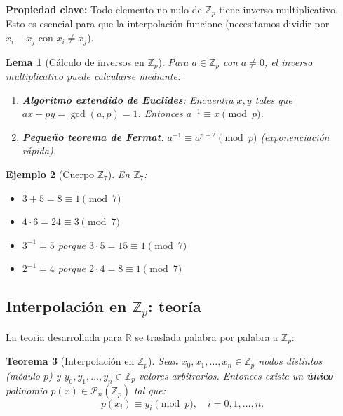\documentclass[a4paper,11pt]{report}
\newtheorem{theorem}{Teorema}[chapter]
\newtheorem{lemma}[theorem]{Lema}
\newtheorem{example}[theorem]{Ejemplo}
\begin{document}
\textbf{Propiedad clave:} Todo elemento no nulo de $\mathbb{Z}_p$ tiene inverso multiplicativo. Esto es esencial para que la interpolación funcione (necesitamos dividir por $x_i - x_j$ con $x_i \neq x_j$).

\begin{lemma}[Cálculo de inversos en $\mathbb{Z}_p$]
Para $a \in \mathbb{Z}_p$ con $a \neq 0$, el inverso multiplicativo puede calcularse mediante:
\begin{enumerate}
\item \textbf{Algoritmo extendido de Euclides}: Encuentra $x, y$ tales que $ax + py = \gcd(a,p) = 1$. Entonces $a^{-1} \equiv x \pmod{p}$.
\item \textbf{Pequeño teorema de Fermat}: $a^{-1} \equiv a^{p-2} \pmod{p}$ (exponenciación rápida).
\end{enumerate}
\end{lemma}

\begin{example}[Cuerpo $\mathbb{Z}_7$]
En $\mathbb{Z}_7$:
\begin{itemize}
\item $3 + 5 = 8 \equiv 1 \pmod{7}$
\item $4 \cdot 6 = 24 \equiv 3 \pmod{7}$
\item $3^{-1} = 5$ porque $3 \cdot 5 = 15 \equiv 1 \pmod{7}$
\item $2^{-1} = 4$ porque $2 \cdot 4 = 8 \equiv 1 \pmod{7}$
\end{itemize}
\end{example}

\subsection{Interpolación en $\mathbb{Z}_p$: teoría}

La teoría desarrollada para $\mathbb{R}$ se traslada palabra por palabra a $\mathbb{Z}_p$:

\begin{theorem}[Interpolación en $\mathbb{Z}_p$]
Sean $x_0, x_1, \ldots, x_n \in \mathbb{Z}_p$ nodos distintos (módulo $p$) y $y_0, y_1, \ldots, y_n \in \mathbb{Z}_p$ valores arbitrarios. Entonces existe un \textbf{único} polinomio $p(x) \in \mathcal{P}_n(\mathbb{Z}_p)$ tal que:
\[
p(x_i) \equiv y_i \pmod{p}, \quad i = 0, 1, \ldots, n.
\]
\end{theorem}
\end{document}
